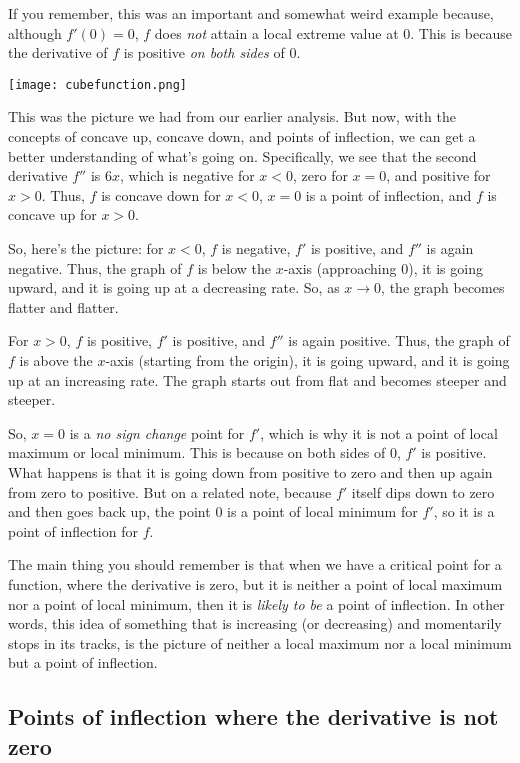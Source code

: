 \documentclass[10pt]{amsart}
\begin{document}
If you remember, this was an important and somewhat weird example
because, although $f'(0) = 0$, $f$ does {\em not} attain a local
extreme value at $0$. This is because the derivative of $f$ is
positive {\em on both sides} of $0$.

\texttt{[image: cubefunction.png]}

This was the picture we had from our earlier analysis. But now, with
the concepts of concave up, concave down, and points of inflection, we
can get a better understanding of what's going on. Specifically, we
see that the second derivative $f''$ is $6x$, which is negative for $x
< 0$, zero for $x = 0$, and positive for $x > 0$. Thus, $f$ is concave
down for $x < 0$, $x = 0$ is a point of inflection, and $f$ is concave
up for $x > 0$.

So, here's the picture: for $x < 0$, $f$ is negative, $f'$ is
positive, and $f''$ is again negative. Thus, the graph of $f$ is below
the $x$-axis (approaching $0$), it is going upward, and it is going up
at a decreasing rate. So, as $x \to 0$, the graph becomes flatter and
flatter.

For $x > 0$, $f$ is positive, $f'$ is positive, and $f''$ is again
positive. Thus, the graph of $f$ is above the $x$-axis (starting from
the origin), it is going upward, and it is going up at an increasing
rate. The graph starts out from flat and becomes steeper and steeper.

So, $x = 0$ is a {\em no sign change} point for $f'$, which is why it
is not a point of local maximum or local minimum. This is because on
both sides of $0$, $f'$ is positive. What happens is that it is going
down from positive to zero and then up again from zero to
positive. But on a related note, because $f'$ itself dips down to zero
and then goes back up, the point $0$ is a point of local minimum for
$f'$, so it is a point of inflection for $f$.

The main thing you should remember is that when we have a critical
point for a function, where the derivative is zero, but it is neither
a point of local maximum nor a point of local minimum, then it is {\em
likely to be} a point of inflection. In other words, this idea of
something that is increasing (or decreasing) and momentarily stops in
its tracks, is the picture of neither a local maximum nor a local
minimum but a point of inflection.

\subsection{Points of inflection where the derivative is not zero}
\end{document}

